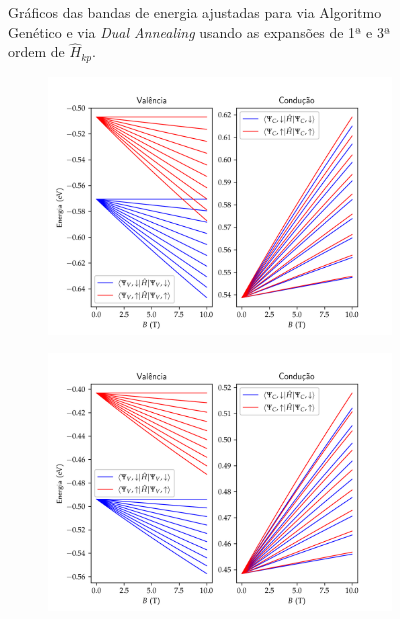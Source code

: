 \begin{figure}[p]
\begin{subfigure}{\textwidth}
    \caption{}
    \label{fig:crse2_dual_annealing}
  \end{subfigure}
  \caption{
    Gráficos das bandas de energia ajustadas para  via Algoritmo Genético
     e via \textit{Dual Annealing}
     usando as expansões de 1ª e 3ª ordem de $ \hat{H}_{kp} $.
  }
  \label{fig:crse2}
\end{figure}

\begin{figure}[p]
  \centering
  \begin{subfigure}{\textwidth}
    \includegraphics[trim=0 0.28cm 0 0.9cm,clip,width=\textwidth]{imagens/crs2_k_valley_landau_levels.png}
    \caption{}
    \label{fig:crs2_k_valley_landau_levels}
  \end{subfigure}
  \begin{subfigure}{\textwidth}
    \includegraphics[trim=0 0.28cm 0 0.9cm,clip,width=\textwidth]{imagens/crse2_k_valley_landau_levels.png}

\end{subfigure}
\end{figure}
